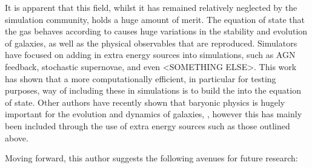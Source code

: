 It is apparent that this field, whilst it has remained relatively neglected by the simulation community, holds a huge amount of merit.
The equation of state that the gas behaves according to causes huge variations in the stability and evolution of galaxies, as well as the physical observables that are reproduced.
Simulators have focused on adding in extra energy sources into simulations, such as AGN feedback, stochastic supernovae, and even <SOMETHING ELSE>.
This work has shown that a more computationally efficient, in particular for testing purposes, way of including these in simulations is to build the into the equation of state.
Other authors have recently shown that baryonic physics is hugely important for the evolution and dynamics of galaxies, \citep{eagle, illustris}, however this has mainly been included through the use of extra energy sources such as those outlined above.

Moving forward, this author suggests the following avenues for future research:
